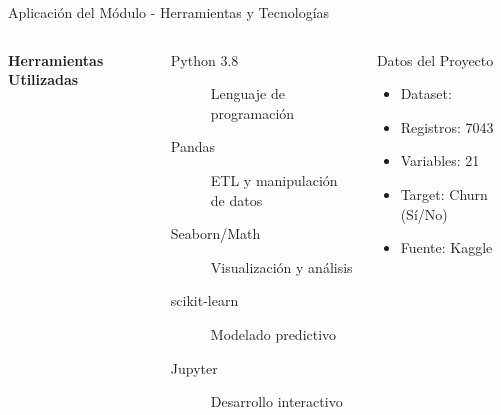 
\begin{frame}{Aplicación del Módulo - Herramientas y Tecnologías}
    \begin{columns}[t]
        \textbf{Herramientas Utilizadas}
        \begin{description}
            \item[Python 3.8] Lenguaje de programación
            \item[Pandas] ETL y manipulación de datos
            \item[Seaborn/Math] Visualización y análisis
            \item[scikit-learn] Modelado predictivo
            \item[Jupyter] Desarrollo interactivo
        \end{description}
        
        \begin{block}{Datos del Proyecto}
            \begin{itemize}
                \item Dataset: \datasetname
                \item Registros: 7043
                \item Variables: 21
                \item Target: Churn (Sí/No)
                \item Fuente: Kaggle
            \end{itemize}
        \end{block}
    \end{columns}
    

\end{frame}

